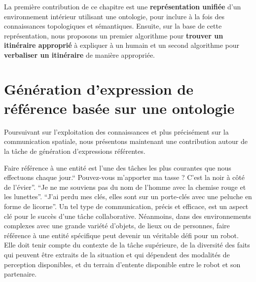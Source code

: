 La première contribution de ce chapitre est une \textbf{représentation unifiée} d'un environnement intérieur utilisant une ontologie, pour inclure à la fois des connaissances topologiques et sémantiques. Ensuite, sur la base de cette représentation, nous proposons un premier algorithme pour \textbf{trouver un itinéraire approprié} à expliquer à un humain et un second algorithme pour \textbf{verbaliser un itinéraire} de manière appropriée. 

\section*{Génération d'expression de référence basée sur une ontologie}

Poursuivant sur l'exploitation des connaissances et plus précisément sur la communication spatiale, nous présentons maintenant une contribution autour de la tâche de génération d'expressions référentes.

Faire référence à une entité est l'une des tâches les plus courantes que nous effectuons chaque jour.`` Pouvez-vous m'apporter ma tasse ? C'est la noir à côté de l'évier''. ``Je ne me souviens pas du nom de l'homme avec la chemise rouge et les lunettes''. ``J'ai perdu mes clés, elles sont sur un porte-clés avec une peluche en forme de licorne''. Un tel type de communication, précis et efficace, est un aspect clé pour le succès d'une tâche collaborative. Néanmoins, dans des environnements complexes avec une grande variété d'objets, de lieux ou de personnes, faire référence à une entité spécifique peut devenir un véritable défi pour un robot. Elle doit tenir compte du contexte de la tâche supérieure, de la diversité des faits qui peuvent être extraits de la situation et qui dépendent des modalités de perception disponibles, et du terrain d'entente disponible entre le robot et son partenaire. 

